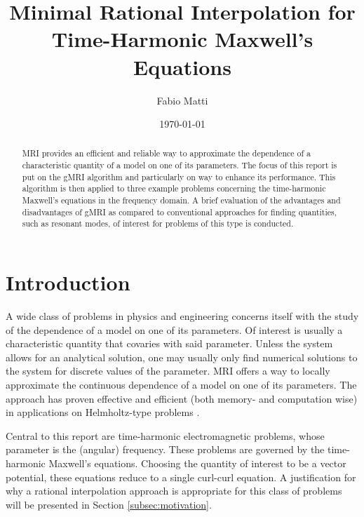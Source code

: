 \documentclass[11pt, a4paper]{article}
\title{Minimal Rational Interpolation for Time-Harmonic Maxwell's Equations}
\author{Fabio Matti}
\date{\today}
\begin{document}
\maketitle

\begin{abstract}
    \acrfull{MRI} provides an efficient and reliable way to approximate the 
    dependence of a characteristic quantity of a model on one of its parameters.
    The focus of this report is put on the \acrfull{gMRI} algorithm and particularly
    on way to enhance its performance. This algorithm is then applied to three 
    example problems concerning the time-harmonic Maxwell's equations in the 
    frequency domain. A brief evaluation of the advantages and disadvantages of
    \acrshort{gMRI} as compared to conventional approaches for finding quantities,
    such as resonant modes, of interest for problems of this type is conducted.
\end{abstract}


\newpage
\tableofcontents

\newpage
\section{Introduction}
\label{sec:introduction}

A wide class of problems in physics and engineering concerns itself with the
study of the dependence of a model on one of its parameters. 
Of interest is usually a characteristic quantity that covaries with said parameter.
Unless the system allows for an analytical solution, one may usually only
find numerical solutions to the system for discrete values of the parameter.
\acrfull{MRI} offers a way to locally approximate the continuous
dependence of a model on one of its parameters. The approach has proven
effective and efficient (both memory- and computation wise) in applications
on Helmholtz-type problems \cite{greedyMRI, shortMRI}.

Central to this report are time-harmonic electromagnetic problems, whose 
parameter is the (angular) frequency. These problems are governed by
the time-harmonic Maxwell's equations. Choosing the quantity of interest
to be a vector potential, these equations reduce to a single curl-curl equation.
A justification for why a rational interpolation approach is appropriate for
this class of problems will be presented in Section \ref{subsec:motivation}.
\end{document}
